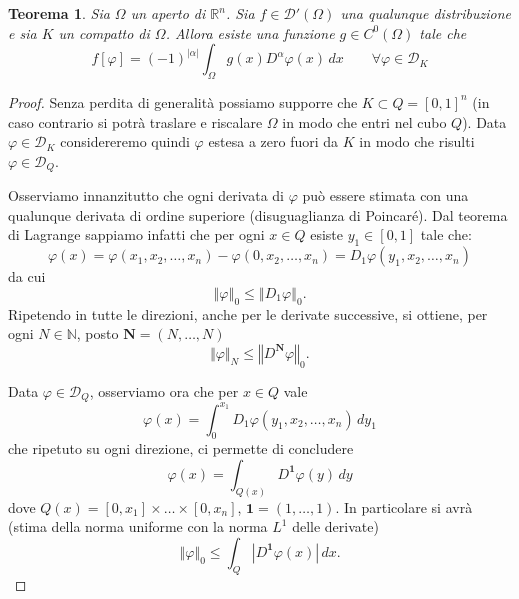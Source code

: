\documentclass[italian,a4paper,oneside,headinclude]{scrbook}
\renewcommand{\phi}{\varphi}
\newcommand{\D}{\mathcal D}
\newcommand{\NN}{\mathbb N}
\newcommand{\RR}{\mathbb R}
\newcommand{\abs}[1]{{\left|#1\right|}}
\newcommand{\Abs}[1]{{\left\Vert #1\right\Vert}}
\renewcommand{\vec}[1]{\mathbf #1}
\newtheorem{theorem}{Teorema}
\begin{document}
\begin{theorem}
  Sia $\Omega$ un aperto di $\RR^n$.
  Sia $f\in \D'(\Omega)$ una qualunque distribuzione e sia $K$ un
  compatto di $\Omega$. Allora esiste una funzione $g\in C^0(\Omega)$
  tale che
  \[
    f[\phi] = (-1)^{\abs{\alpha}} \int_\Omega g(x)
    D^\alpha\phi(x)\, dx \qquad \forall \phi \in \D_K
  \]
\end{theorem}
%
\begin{proof}
  Senza perdita di generalità possiamo supporre che
  $K\subset Q=[0,1]^n$
  (in caso contrario si potrà traslare e riscalare $\Omega$ in modo che
  entri nel cubo $Q$). Data $\phi \in \D_K$ considereremo quindi $\phi$
  estesa a zero fuori da $K$ in modo che risulti $\phi\in \D_Q$.

  Osserviamo innanzitutto che ogni derivata di $\phi$ può essere
  stimata con una qualunque derivata
  di ordine superiore (disuguaglianza di
  Poincaré). Dal teorema di Lagrange sappiamo infatti che per ogni
  $x\in Q$ esiste $y_1\in [0,1]$ tale che:
  \[
  \phi(x) = \phi(x_1,x_2,\dots,x_n) - \phi(0,x_2,\dots,x_n) =
  D_1 \phi(y_1,x_2,\dots, x_n)
  \]
  da cui
  \[
  \Abs{\phi}_0 \le \Abs{D_1 \phi}_0.
  \]
  Ripetendo in tutte le direzioni, anche per le derivate successive,
  si ottiene, per ogni $N\in \NN$, posto $\vec N = (N,\dots,N)$
  \[
  \Vert\phi\Vert_N \le \Abs{D^{\vec N} \phi}_0.
  \]

  Data $\phi\in \D_Q$, osserviamo ora che per $x\in Q$ vale
  \[
  \phi(x)
  = \int_0^{x_1} D_1 \phi (y_1,x_2,\dots, x_n)\, dy_1
  \]
  che ripetuto su ogni direzione, ci permette di concludere
  \begin{equation}\label{eq:dvec1}
  \phi(x) = \int_{Q(x)} D^{\vec 1} \phi(y)\, dy
  \end{equation}
  dove $Q(x) = [0,x_1]\times \dots \times [0,x_n]$,
  $\vec 1 =  (1,\dots,1)$.
  In particolare si avrà (stima della norma uniforme con la norma
  $L^1$ delle derivate)
  \[
    \Abs{\phi}_0 \le \int_Q \abs{D^{\vec 1} \phi(x)}\, dx.
  \]


\end{proof}
\end{document}
